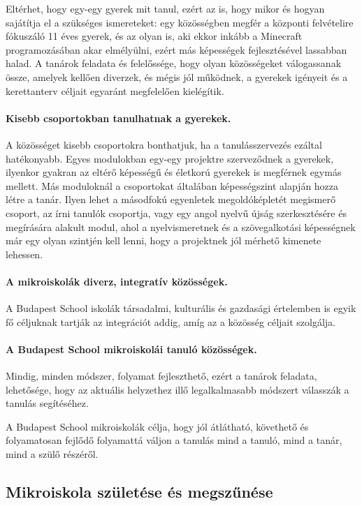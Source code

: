 Eltérhet, hogy egy-egy gyerek mit tanul, ezért az is, hogy mikor és hogyan
sajátítja el a szükséges ismereteket: egy közösségben megfér a központi
felvételire fókuszáló 11 éves gyerek, és az olyan is, aki ekkor inkább a
Mine\-craft programozásában akar elmélyülni, ezért más képességek
fejlesztésével
lassabban halad. A tanárok feladata és felelőssége, hogy olyan közösségeket
válogassanak össze, amelyek kellően diverzek, és mégis jól működnek, a
gyerekek
igényeit és a kerettanterv céljait egyaránt megfelelően kielégítik.

\paragraph{Kisebb csoportokban tanulhatnak a gyerekek.}

A közösséget kisebb csoportokra bonthatjuk, ha a tanulásszervezés ezáltal
hatékonyabb. Egyes modulokban egy-egy projektre szerveződnek a gyerekek,
ilyenkor gyakran az eltérő képességű és életkorú gyerekek is megférnek
egymás
mellett. Más moduloknál a csoportokat általában képességszint alapján hozza
létre a tanár. Ilyen lehet a másodfokú egyenletek megoldóképletét megismerő
csoport, az írni tanulók csoportja, vagy egy angol nyelvű újság
szerkesztésére
és megírására alakult modul, ahol a nyelvismeretnek és a szövegalkotási
képességnek már egy olyan szintjén kell lenni, hogy a projektnek jól
mérhető
kimenete lehessen.

\paragraph{A mikroiskolák diverz, integratív közösségek.} A Budapest School
iskolák társadalmi,
kulturális és gazdasági értelemben is egyik fő céljuknak tartják az
integrációt addig,
amíg az a közösség céljait szolgálja.

\paragraph{A Budapest School mikroiskolái tanuló közösségek.} Mindig, minden
módszer,
folyamat fejleszthető, ezért a tanárok feladata, lehetősége, hogy az aktuális
helyzethez illő legalkalmasabb módszert válasszák a tanulás segítéséhez.

A Budapest School mikroiskolák célja, hogy jól átlátható, követhető és
folyamatosan fejlődő folyamattá váljon a tanulás mind a tanuló, mind a tanár,
mind
a szülő részéről.

\subsection{Mikroiskola születése és megszűnése}

